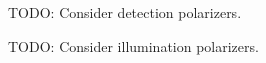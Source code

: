 \documentclass[11pt]{article}
\providecommand{\mb}[1]{\mathbf{#1}}
\providecommand{\ro}[1]{\mathbf{\mathfrak{r}}_o}
\providecommand{\so}[1]{\mathbf{\hat{s}}_o}
\providecommand{\rb}[1]{\mathbf{r}_b}
\providecommand{\bs}[1]{\boldsymbol{#1}}
\begin{document}
TODO: Consider detection polarizers.

TODO: Consider illumination polarizers. 


\end{document}
